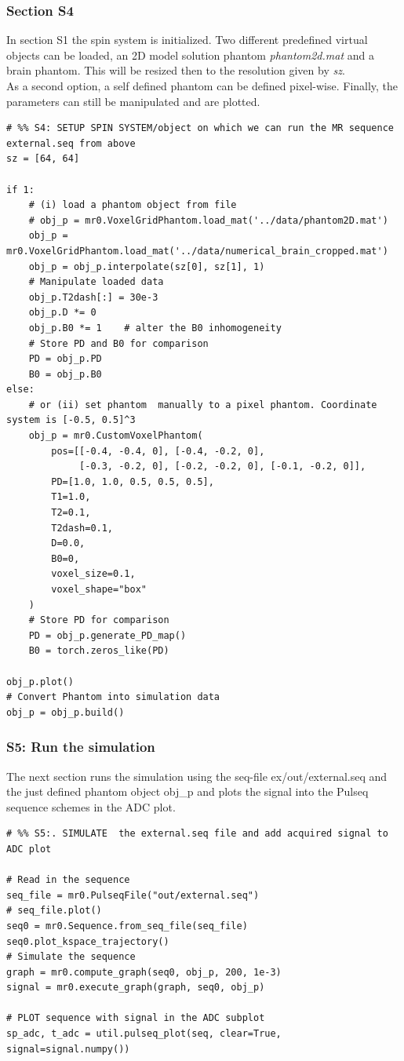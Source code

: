 \documentclass[a4paper,12pt]{extarticle}
\begin{document}
\subsubsection{Section S4}
In section S1 the spin system is initialized. Two different predefined virtual objects can be loaded, an 2D model solution phantom \emph{phantom2d.mat} and a brain phantom. This will be resized then to the resolution given by \emph{sz}.  \\
As a second option, a self defined phantom can be defined pixel-wise.
Finally, the parameters can still be manipulated and are plotted.

\begin{verbatim}
# %% S4: SETUP SPIN SYSTEM/object on which we can run the MR sequence external.seq from above
sz = [64, 64]

if 1:
    # (i) load a phantom object from file
    # obj_p = mr0.VoxelGridPhantom.load_mat('../data/phantom2D.mat')
    obj_p = mr0.VoxelGridPhantom.load_mat('../data/numerical_brain_cropped.mat')
    obj_p = obj_p.interpolate(sz[0], sz[1], 1)
    # Manipulate loaded data
    obj_p.T2dash[:] = 30e-3
    obj_p.D *= 0 
    obj_p.B0 *= 1    # alter the B0 inhomogeneity
    # Store PD and B0 for comparison
    PD = obj_p.PD
    B0 = obj_p.B0
else:
    # or (ii) set phantom  manually to a pixel phantom. Coordinate system is [-0.5, 0.5]^3
    obj_p = mr0.CustomVoxelPhantom(
        pos=[[-0.4, -0.4, 0], [-0.4, -0.2, 0],
             [-0.3, -0.2, 0], [-0.2, -0.2, 0], [-0.1, -0.2, 0]],
        PD=[1.0, 1.0, 0.5, 0.5, 0.5],
        T1=1.0,
        T2=0.1,
        T2dash=0.1,
        D=0.0,
        B0=0,
        voxel_size=0.1,
        voxel_shape="box"
    )
    # Store PD for comparison
    PD = obj_p.generate_PD_map()
    B0 = torch.zeros_like(PD)

obj_p.plot()
# Convert Phantom into simulation data
obj_p = obj_p.build()

\end{verbatim}

\subsubsection{S5: Run the simulation}
The next section runs the simulation using the seq-file ex/out/external.seq and  the just defined phantom object obj\_p and plots the signal into the Pulseq sequence schemes in the ADC plot.

\begin{verbatim}
# %% S5:. SIMULATE  the external.seq file and add acquired signal to ADC plot

# Read in the sequence
seq_file = mr0.PulseqFile("out/external.seq")
# seq_file.plot()
seq0 = mr0.Sequence.from_seq_file(seq_file)
seq0.plot_kspace_trajectory()
# Simulate the sequence
graph = mr0.compute_graph(seq0, obj_p, 200, 1e-3)
signal = mr0.execute_graph(graph, seq0, obj_p)

# PLOT sequence with signal in the ADC subplot
sp_adc, t_adc = util.pulseq_plot(seq, clear=True, signal=signal.numpy())
\end{verbatim}
\end{document}
